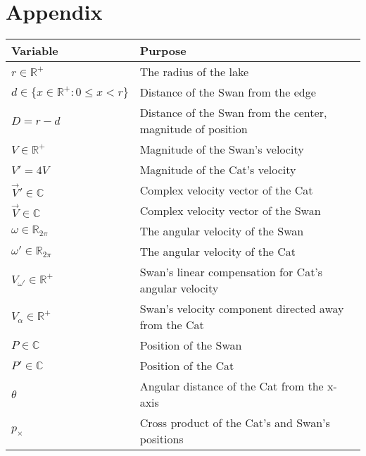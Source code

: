 \documentclass[12pt]{article}
\begin{document}
\section*{Appendix}

\begin{tabular}{|l|l|}
\hline
\textbf{Variable} & \textbf{Purpose}\\
\hline
$r \in {\mathbb{R}^+}$ & The radius of the lake\\
$d \in \{x \in \mathbb{R^+}: 0 \leq x < r \}$ & Distance of the Swan from the edge\\
$D = r - d$ & Distance of the Swan from the center, magnitude of position\\
$V \in {\mathbb{R}^+}$ & Magnitude of the Swan's velocity\\
$V' = 4V$ & Magnitude of the Cat's velocity\\
$\vec{V}' \in \mathbb{C}$ & Complex velocity vector of the Cat\\
$\vec{V} \in \mathbb{C}$ & Complex velocity vector of the Swan\\
$\omega \in \mathbb{R}_{2\pi}$ & The angular velocity of the Swan\\
$\omega' \in \mathbb{R}_{2\pi}$ & The angular velocity of the Cat\\
$V_{\omega'} \in \mathbb{R^+}$ & Swan's linear compensation for Cat's angular velocity\\
$V_\alpha \in \mathbb{R^+}$ & Swan's velocity component directed away from the Cat\\
$P \in \mathbb{C}$ & Position of the Swan\\
$P' \in \mathbb{C}$ & Position of the Cat\\
$\theta$ & Angular distance of the Cat from the x-axis\\
$p_\times$ & Cross product of the Cat's and Swan's positions\\
\hline
\end{tabular}
\vspace{12pt}



\end{document}
